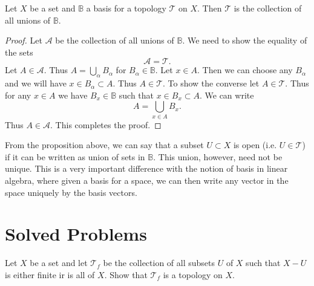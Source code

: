 \begin{proposition}
	Let $ X $ be a set and $ \mathbb{B} $ a basis for a topology $ \mathcal{T} $ on $ X $. Then $ \mathcal{T} $ is the collection of all unions of $ \mathbb{B} $.
\end{proposition}
\begin{proof}
	Let $ \mathcal{A} $ be the collection of all unions of $ \mathbb{B} $. We need to show the equality of the sets  
	\[ \mathcal{A} = \mathcal{T}. \]
	Let $ A \in \mathcal{A} $. Thus $ A = \bigcup_\alpha B_\alpha $ for $ B_\alpha \in \mathbb{B} $. Let $  x \in A $. Then we can choose any $ B_\alpha $ and we will have $ x \in B_\alpha \subset A $. Thus $ A \in \mathcal{T} $. To show the converse let $ A \in \mathcal{T} $. Thus for any $ x\in A $ we have $ B_x \in \mathbb{B} $ such that $ x \in B_x \subset A $. We can write
	\[ A = \bigcup_{x \in A} B_x. \]
	Thus $ A \in \mathcal{A} $. This completes the proof.
\end{proof}


\begin{carefull}
	From the proposition above, we can say that a subset $ U \subset X $ is open (i.e. $ U \in \mathcal{T} $) if it can be written as union of sets in $ \mathbb{B} $. This union, however, need not be unique. This is a very important difference with the notion of basis in linear algebra, where given a basis for a space, we can then write any vector in the space uniquely by the basis vectors.
\end{carefull}

\section{Solved Problems}


\begin{problem}
	Let $ X $ be a set and let $ \mathcal{T}_f $ be the collection of all subsets $ U $ of $ X $ such that $ X - U $ is either finite ir is all of $ X $. Show that $ \mathcal{T}_f $ is a topology on $ X $.
\end{problem}


